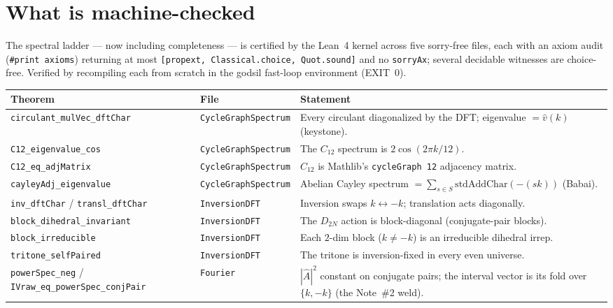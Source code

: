 \documentclass[11pt]{article}
\newcommand{\lean}[1]{\texttt{#1}}
\newcommand{\Ahat}{\hat{A}}
\begin{document}
\section{What is machine-checked}\label{sec:checked}

The spectral ladder --- now including completeness --- is certified by the Lean~4 kernel across five
sorry-free files, each with an axiom audit (\lean{\#print axioms}) returning at most
\lean{[propext, Classical.choice, Quot.sound]} and no \lean{sorryAx}; several decidable witnesses are
choice-free. Verified by recompiling each from scratch in the godsil fast-loop environment (EXIT~0).

\begin{table}[!ht]
\centering\footnotesize
\setlength{\tabcolsep}{4pt}
\begin{tabular}{@{}p{} p{} p{}@{}}
\toprule
\rowcolor{ctA!22}
\textbf{Theorem} & \textbf{File} & \textbf{Statement}\\
\midrule
\lean{circulant\_mulVec\_dftChar} & \lean{CycleGraphSpectrum} & Every circulant diagonalized by the DFT; eigenvalue $=\hat v(k)$ (keystone).\\
\lean{C12\_eigenvalue\_cos} & \lean{CycleGraphSpectrum} & The $C_{12}$ spectrum is $2\cos(2\pi k/12)$.\\
\lean{C12\_eq\_adjMatrix} & \lean{CycleGraphSpectrum} & $C_{12}$ is Mathlib's \texttt{cycleGraph 12} adjacency matrix.\\
\lean{cayleyAdj\_eigenvalue} & \lean{CycleGraphSpectrum} & Abelian Cayley spectrum $=\sum_{s\in S}\mathrm{stdAddChar}(-(sk))$ (Babai).\\
\lean{inv\_dftChar} / \lean{transl\_dftChar} & \lean{InversionDFT} & Inversion swaps $k\leftrightarrow-k$; translation acts diagonally.\\
\lean{block\_dihedral\_invariant} & \lean{InversionDFT} & The $D_{2N}$ action is block-diagonal (conjugate-pair blocks).\\
\lean{block\_irreducible} & \lean{InversionDFT} & Each $2$-dim block ($k\neq-k$) is an irreducible dihedral irrep.\\
\lean{tritone\_selfPaired} & \lean{InversionDFT} & The tritone is inversion-fixed in every even universe.\\
\lean{powerSpec\_neg} / \lean{IVraw\_eq\_powerSpec\_conjPair} & \lean{Fourier} & $|\Ahat|^2$ constant on conjugate pairs; the interval vector is its fold over $\{k,-k\}$ (the Note~\#2 weld).\\

\end{tabular}
\end{table}
\end{document}
